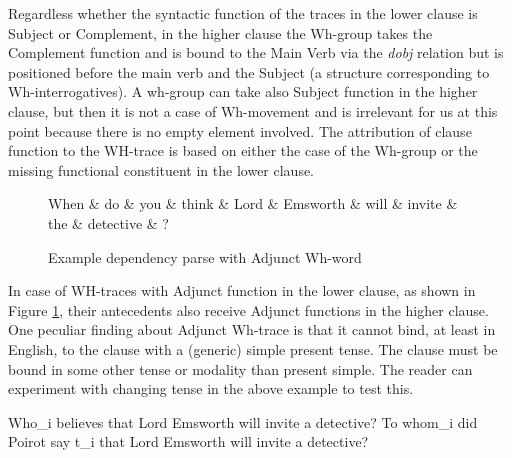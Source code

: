     Regardless whether the syntactic function of the traces in the lower clause is Subject or Complement, in the higher clause the Wh-group takes the Complement function and is bound to the Main Verb via the \textit{dobj} relation but is positioned before the main verb and the Subject (a structure corresponding to Wh-interrogatives). A wh-group can take also Subject function in the higher clause, but then it is not a case of Wh-movement and is irrelevant for us at this point because there is no empty element involved. The attribution of clause function to the WH-trace is based on either the case of the Wh-group or the missing functional constituent in the lower clause. 

    \begin{figure}[!ht]
    	\centering
    	\begin{dependency}
    		\begin{deptext}[]
    			When \& do \& you \& think \& Lord \& Emsworth \& will \& invite \& the \& detective \& ?\\
    		\end{deptext}
    	\end{dependency}
    	\caption{Example dependency parse with Adjunct Wh-word}
    	\label{fig:e22}
    \end{figure}

    In case of WH-traces with Adjunct function in the lower clause, as shown in Figure \ref{fig:e22}, their antecedents also receive Adjunct functions in the higher clause. One peculiar finding about Adjunct Wh-trace is that it cannot bind, at least in English, to the clause with a (generic) simple present tense. The clause must be bound in some other tense or modality than present simple. The reader can experiment with changing tense in the above example to test this. 

    \begin{exe}
    	\ex\label{ex:wh20} Who_{i} believes that Lord Emsworth will invite a detective?
    	\ex\label{ex:wh21} To whom_{i} did Poirot say t_{i} that Lord Emsworth will invite a detective?
    \end{exe}

